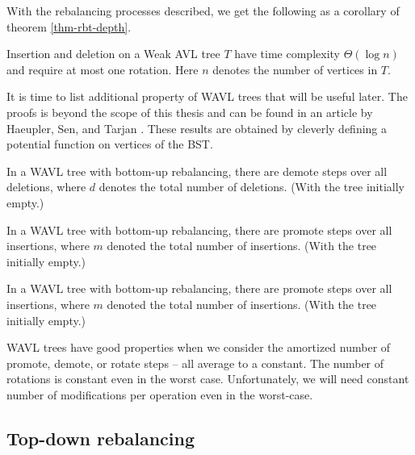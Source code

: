 







With the rebalancing processes described, we get the following as a corollary of theorem \ref{thm-rbt-depth}.

\begin{prop}
Insertion and deletion on a Weak AVL tree $T$ have time complexity $\Theta(\log n)$ and require at most one rotation. Here $n$ denotes the number of vertices in $T$.
\end{prop}

It is time to list additional property of WAVL trees that will be useful later. The proofs is beyond the scope of this thesis and can be found in an article by Haeupler, Sen, and Tarjan \cite{rank-balanced-trees}. These results are obtained by cleverly defining a potential function on vertices of the BST.

\begin{thm}
In a WAVL tree with bottom-up rebalancing, there are  demote steps over all deletions, where $d$ denotes the total number of deletions. (With the tree initially empty.)
\end{thm}

\begin{thm}
In a WAVL tree with bottom-up rebalancing, there are  promote steps over all insertions, where $m$ denoted the total number of insertions. (With the tree initially empty.)
\end{thm}

\begin{thm}
	In a WAVL tree with bottom-up rebalancing, there are  promote steps over all insertions, where $m$ denoted the total number of insertions. (With the tree initially empty.)
\end{thm}

WAVL trees have good properties when we consider the amortized number of promote, demote, or rotate steps -- all average to a constant. The number of rotations is constant even in the worst case. Unfortunately, we will need constant number of modifications per operation even in the worst-case.

\subsection{Top-down rebalancing}

